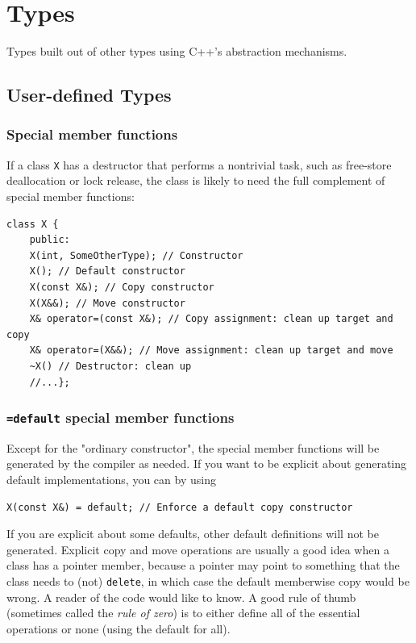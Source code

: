 \documentclass[table, xcdraw]{article}%
\begin{document}
\section{Types}

Types built out of other types using C++'s abstraction mechanisms.

\subsection{User-defined Types}

\subsubsection{Special member functions}

If a class \texttt{X} has a destructor that performs a nontrivial task, such as free-store deallocation or lock release, the class is likely to need the full complement of special member functions:

\begin{verbatim}
class X {
    public:
    X(int, SomeOtherType); // Constructor
    X(); // Default constructor
    X(const X&); // Copy constructor
    X(X&&); // Move constructor
    X& operator=(const X&); // Copy assignment: clean up target and copy
    X& operator=(X&&); // Move assignment: clean up target and move 
    ~X() // Destructor: clean up
    //...};
\end{verbatim}

\subsubsection{\texttt{=default} special member functions}

Except for the "ordinary constructor", the special member functions will be generated by the compiler as needed. If you want to be explicit about generating default implementations, you can by using 
\begin{verbatim}
X(const X&) = default; // Enforce a default copy constructor
\end{verbatim}

If you are explicit about some defaults, other default definitions will not be generated. Explicit copy and move operations are usually a good idea when a class has a pointer member, because a pointer may point to something that the class needs to (not) \texttt{delete}, in which case the default memberwise copy would be wrong. A reader of the code would like to know. A good rule of thumb (sometimes called the \textit{rule of zero}) is to either define all of the essential operations or none (using the default for all). 
\end{document}
